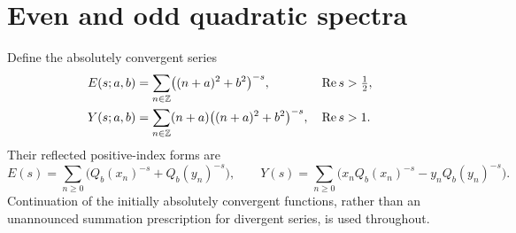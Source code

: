 \section{Even and odd quadratic spectra}\label{qspec:sec:transform}

Define the absolutely convergent series
\begin{align}
E(s;a,b)&=\sum_{n\in\mathbb Z}\bigl((n+a)^2+b^2\bigr)^{-s},
&&\operatorname{Re} s>\tfrac12,\label{qspec:eq:E}\\
Y(s;a,b)&=\sum_{n\in\mathbb Z}(n+a)\bigl((n+a)^2+b^2\bigr)^{-s},
&&\operatorname{Re} s>1.\label{qspec:eq:Y}
\end{align}
Their reflected positive-index forms are
\[
E(s)=\sum_{n\ge0}\bigl(Q_b(x_n)^{-s}+Q_b(y_n)^{-s}\bigr),
\qquad
Y(s)=\sum_{n\ge0}\bigl(x_nQ_b(x_n)^{-s}-y_nQ_b(y_n)^{-s}\bigr).
\]
Continuation of the initially absolutely convergent functions, rather than
an unannounced summation prescription for divergent series, is used throughout.

